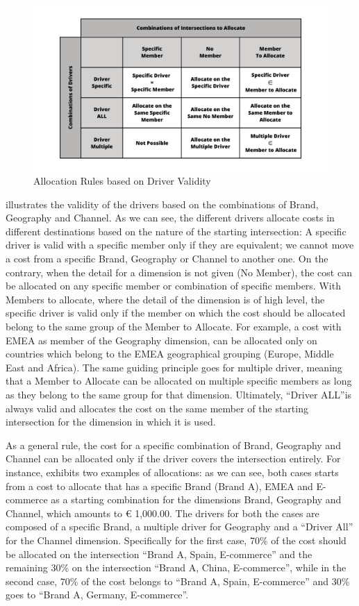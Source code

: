 \documentclass[12pt,a4paper,openright,twoside]{book}
\begin{document}
\begin{figure}[htbp]
	\centering
	\includegraphics[width=\linewidth]{figures/driver-table.pdf}
	\caption{Allocation Rules based on Driver Validity}
	\label{fig:driver}
\end{figure}

 illustrates the validity of the drivers based on the combinations of Brand, Geography and Channel.
%
As we can see, the different drivers allocate costs in different destinations based on the nature of the  starting intersection:
%
A specific driver is valid with a specific member only if they are equivalent; we cannot move a cost from a specific Brand, Geography or Channel to another one.
%
On the contrary, when the detail for a dimension is not given (No Member), the cost can be allocated on any specific member or combination of specific members.
%
With Members to allocate, where the detail of the dimension is of high level, the specific driver is valid only if the member on which the cost should be allocated belong to the same group of the Member to Allocate.
%
For example, a cost with EMEA as member of the Geography dimension, can be allocated only on countries which belong to the EMEA geographical grouping (Europe, Middle East and Africa).
%
The same guiding principle goes for multiple driver, meaning that a Member to Allocate can be allocated on multiple specific members as long as they belong to the same group for that dimension.
%
Ultimately, ``Driver ALL''is always valid and allocates the cost on the same member of the starting intersection for the dimension in which it is used.

As a general rule, the cost for a specific combination of Brand, Geography and Channel can be allocated only if the driver covers the intersection entirely.
%
For instance,  exhibits two examples of allocations: as we can see, both cases starts from a cost to allocate that has a specific Brand (Brand A), EMEA and E-commerce as a starting combination for the dimensions Brand, Geography and Channel, which amounts to € 1,000.00.
%
The drivers for both the cases are composed of a specific Brand, a multiple driver for Geography and a ``Driver All'' for the Channel dimension.
%
Specifically for the first case, 70\% of the cost should be allocated on the intersection ``Brand A, Spain, E-commerce'' and the remaining 30\% on the intersection ``Brand A, China, E-commerce'', while in the second case, 70\% of the cost belongs to ``Brand A, Spain, E-commerce'' and 30\% goes to ``Brand A, Germany, E-commerce''.
\end{document}
